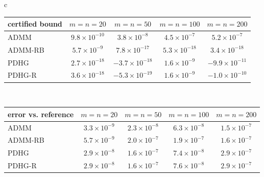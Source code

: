 \begin{tabular}{c}
\begin{tabular}{lcccc}
\toprule
certified bound & $m=n=20$ & $m=n=50$ & $m=n=100$ & $m=n=200$ \\
\midrule
ADMM & $9.8{\times}10^{-10}$ & $3.8{\times}10^{-8}$ & $4.5{\times}10^{-7}$ & $5.2{\times}10^{-7}$ \\
ADMM-RB & $5.7{\times}10^{-9}$ & $7.8{\times}10^{-17}$ & $5.3{\times}10^{-18}$ & $3.4{\times}10^{-18}$ \\
PDHG & $2.7{\times}10^{-18}$ & $-3.7{\times}10^{-18}$ & $1.6{\times}10^{-9}$ & $-9.9{\times}10^{-11}$ \\
PDHG-R & $3.6{\times}10^{-18}$ & $-5.3{\times}10^{-19}$ & $1.6{\times}10^{-9}$ & $-1.0{\times}10^{-10}$ \\
\bottomrule
\end{tabular}
\\[1.2ex]
\begin{tabular}{lcccc}
\toprule
error vs. reference & $m=n=20$ & $m=n=50$ & $m=n=100$ & $m=n=200$ \\
\midrule
ADMM & $3.3{\times}10^{-9}$ & $2.3{\times}10^{-8}$ & $6.3{\times}10^{-8}$ & $1.5{\times}10^{-7}$ \\
ADMM-RB & $5.7{\times}10^{-9}$ & $2.0{\times}10^{-7}$ & $1.9{\times}10^{-7}$ & $1.6{\times}10^{-7}$ \\
PDHG & $2.9{\times}10^{-8}$ & $1.6{\times}10^{-7}$ & $7.4{\times}10^{-8}$ & $2.9{\times}10^{-7}$ \\
PDHG-R & $2.9{\times}10^{-8}$ & $1.6{\times}10^{-7}$ & $7.6{\times}10^{-8}$ & $2.9{\times}10^{-7}$ \\
\bottomrule
\end{tabular}
\end{tabular}